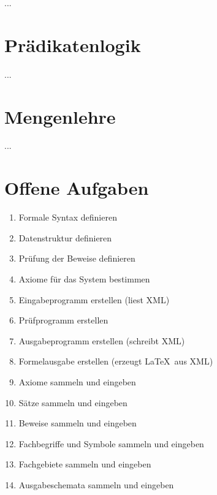 \documentclass[english,ngerman,parskip=half,headsepline,footsepline]{scrreprt}
\begin{document}
	\par ... %
	
	\section{Prädikatenlogik}
	\label{Prädikatenlogik}
	
	... %
	
	\section{Mengenlehre}
	\label{Mengenlehre}
	
	... %
	
	\section{Offene Aufgaben}
	\label{Offene Aufgaben}
	
	\begin{enumerate}
		\item Formale Syntax definieren
		\item Datenstruktur definieren
		\item Prüfung der Beweise definieren
		\item Axiome für das System bestimmen
		\item Eingabeprogramm erstellen (liest XML)
		\item Prüfprogramm erstellen
		\item Ausgabeprogramm erstellen (schreibt XML)
		\item Formelausgabe erstellen (erzeugt \LaTeX\ aus XML)
		\item Axiome sammeln und eingeben
		\item Sätze sammeln und eingeben
		\item Beweise sammeln und eingeben
		\item Fachbegriffe und Symbole sammeln und eingeben
		\item Fachgebiete sammeln und eingeben
		\item Ausgabeschemata sammeln und eingeben
	\end{enumerate}
		

    \clearpage
    
	\begin{minipage}{\textwidth-10.95pt}
    	\listoftables
    \end{minipage}\par
	\thispagestyle{scrheadings}
	
\end{document}

